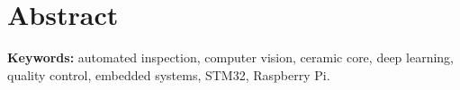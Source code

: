 \chapter*{Abstract}


\vspace{1cm}
\noindent\textbf{Keywords:} automated inspection, computer vision, ceramic core, deep learning, quality control, embedded systems, STM32, Raspberry Pi.
